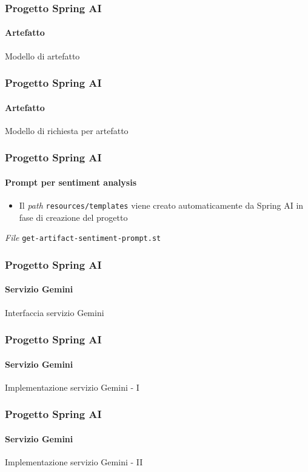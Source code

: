 %
\begin{frame}[t,fragile] \frametitle{Progetto Spring AI}
    \framesubtitle{Artefatto}
        \begin{block}{Modello di artefatto}
			{\tiny}
    	\end{block}
\end{frame}
%
\begin{frame}[t,fragile] \frametitle{Progetto Spring AI}
    \framesubtitle{Artefatto}
        \begin{block}{Modello di richiesta per artefatto}
			{\tiny}
    	\end{block}
\end{frame}
%
\begin{frame}[t,fragile] \frametitle{Progetto Spring AI}
    \framesubtitle{Prompt per sentiment analysis}
        \begin{itemize}[leftmargin=10pt,align=right]
		    \item[\alert{\faExclamationTriangle}] Il \textit{path} \texttt{resources/templates} viene creato automaticamente da Spring AI in fase di creazione del progetto
        \end{itemize}
        \begin{block}{\textit{File} \texttt{get-artifact-sentiment-prompt.st}}
			{\scriptsize}
    	\end{block}
\end{frame}
%
\begin{frame}[t,fragile] \frametitle{Progetto Spring AI}
    \framesubtitle{Servizio Gemini}
        \begin{block}{Interfaccia servizio Gemini}
{\tiny}
    \end{block}
\end{frame}
%
\begin{frame}[t,fragile] \frametitle{Progetto Spring AI}
    \framesubtitle{Servizio Gemini}
		\vspace*{-.7cm}
        \begin{block}{Implementazione servizio Gemini - I}
            {\tiny}
    \end{block}
\end{frame}
%
\begin{frame}[t,fragile] \frametitle{Progetto Spring AI}
    \framesubtitle{Servizio Gemini}
        \begin{block}{Implementazione servizio Gemini - II}
            {\tiny}
    \end{block}
\end{frame}
